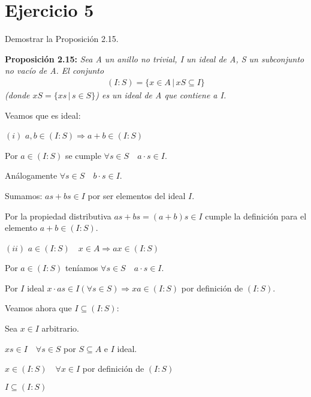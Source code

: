 \documentclass[10pt,a4paper]{article}
\begin{document}
	\section{Ejercicio 5}
	
	Demostrar la Proposición 2.15.
	
	
	\textbf{Proposición 2.15:} \textit{Sea A un anillo no trivial, I un ideal de A, S un subconjunto no vacío de A. El conjunto}
	\begin{gather*}
	\left( I \colon S \right) = \{ x\in A \, \vert \, xS \subseteq I \} 
	\end{gather*}
	\textit{ (donde $ xS = \{ xs \, \vert \, s \in S \} $)	es un ideal de A que contiene a I.}
	
	
	\hfill
	
	Veamos que es ideal:
	
	\hfill
	
	$(i)$ $a,b\in \left( I \colon S \right)  \Rightarrow a+b \in \left( I \colon S \right)$
	
	Por $a \in \left( I \colon S \right)$ se cumple $\forall s \in S \quad a\cdot s \in I$.
	
	Análogamente $\forall s \in S \quad b\cdot s \in I$.
	
	Sumamos: $as + bs \in I$ por ser elementos del ideal $I$.
	
	Por la propiedad distributiva $as+bs=(a+b)s \in I$ cumple la definición para el elemento $a+b \in \left( I \colon S \right).$
	
	\hfill
	
	$(ii)$ $a \in \left( I \colon S \right) \quad x \in A \Rightarrow ax \in \left( I \colon S \right)$
	
	Por $a \in \left( I \colon S \right)$ teníamos $\forall s \in S \quad a\cdot s \in I$.
	
	Por $I$ ideal $x\cdot as \in I \left( \forall s \in S  \right) \Rightarrow xa \in \left( I \colon S \right)$ por definición de $\left( I \colon S \right)$.
	
	
	
	\hfill
	
	Veamos ahora que $I \subseteq \left( I \colon S \right) $:
	
	Sea $x\in I $ arbitrario.
	
	$x s \in I \quad \forall s \in S $ por $ S \subseteq A $ e $I$ ideal.
	
	$x \in \left( I \colon S \right) \quad \forall x \in I$ por definición de $\left( I \colon S \right)$
	
	$I \subseteq \left( I \colon S \right) $
	
\end{document}
